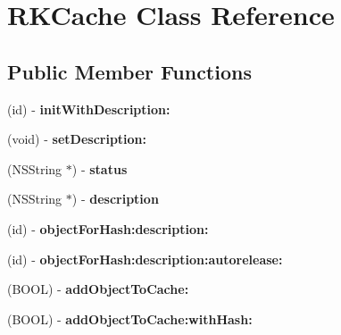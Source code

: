 \hypertarget{interface_r_k_cache}{\section{R\-K\-Cache Class Reference}
\label{interface_r_k_cache}
}
\subsection*{Public Member Functions}
\begin{DoxyCompactItemize}
\item 
\hypertarget{interface_r_k_cache_aaf18e92c4fd0db1f5117f9deaf096a2a}{(id) -\/ {\bfseries init\-With\-Description\-:}}\label{interface_r_k_cache_aaf18e92c4fd0db1f5117f9deaf096a2a}

\item 
\hypertarget{interface_r_k_cache_a8327b3db1c417a50a96bb0c50afe5310}{(void) -\/ {\bfseries set\-Description\-:}}\label{interface_r_k_cache_a8327b3db1c417a50a96bb0c50afe5310}

\item 
\hypertarget{interface_r_k_cache_a75bd37caf28b7fe26a01765ee50f8c39}{(N\-S\-String $\ast$) -\/ {\bfseries status}}\label{interface_r_k_cache_a75bd37caf28b7fe26a01765ee50f8c39}

\item 
\hypertarget{interface_r_k_cache_aa505f34d77ea1400b44c67fc17118ce1}{(N\-S\-String $\ast$) -\/ {\bfseries description}}\label{interface_r_k_cache_aa505f34d77ea1400b44c67fc17118ce1}

\item 
\hypertarget{interface_r_k_cache_a62d1c6218dd542a4a3f01bbf4c30d4f7}{(id) -\/ {\bfseries object\-For\-Hash\-:description\-:}}\label{interface_r_k_cache_a62d1c6218dd542a4a3f01bbf4c30d4f7}

\item 
\hypertarget{interface_r_k_cache_a78c4419a25cce30b95985cd0a1ada575}{(id) -\/ {\bfseries object\-For\-Hash\-:description\-:autorelease\-:}}\label{interface_r_k_cache_a78c4419a25cce30b95985cd0a1ada575}

\item 
\hypertarget{interface_r_k_cache_a48d6429147670a2fa30f13ac84448a81}{(B\-O\-O\-L) -\/ {\bfseries add\-Object\-To\-Cache\-:}}\label{interface_r_k_cache_a48d6429147670a2fa30f13ac84448a81}

\item 
\hypertarget{interface_r_k_cache_a7ef84b23e8b4a1dbf23ec32fef5215d4}{(B\-O\-O\-L) -\/ {\bfseries add\-Object\-To\-Cache\-:with\-Hash\-:}}\label{interface_r_k_cache_a7ef84b23e8b4a1dbf23ec32fef5215d4}


\end{DoxyCompactItemize}
